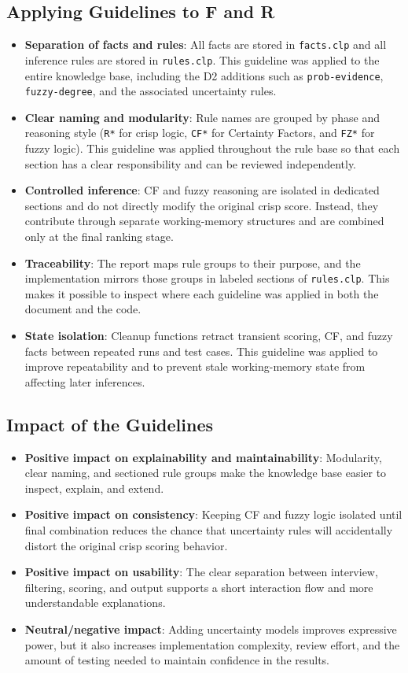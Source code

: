 \documentclass[11pt]{article}
\begin{document}
\subsection{Applying Guidelines to F and R}
\begin{itemize}
  \item \textbf{Separation of facts and rules}: All facts are stored in \texttt{facts.clp} and all inference rules are stored in \texttt{rules.clp}. This guideline was applied to the entire knowledge base, including the D2 additions such as \texttt{prob-evidence}, \texttt{fuzzy-degree}, and the associated uncertainty rules.
  \item \textbf{Clear naming and modularity}: Rule names are grouped by phase and reasoning style (\texttt{R*} for crisp logic, \texttt{CF*} for Certainty Factors, and \texttt{FZ*} for fuzzy logic). This guideline was applied throughout the rule base so that each section has a clear responsibility and can be reviewed independently.
  \item \textbf{Controlled inference}: CF and fuzzy reasoning are isolated in dedicated sections and do not directly modify the original crisp score. Instead, they contribute through separate working-memory structures and are combined only at the final ranking stage.
  \item \textbf{Traceability}: The report maps rule groups to their purpose, and the implementation mirrors those groups in labeled sections of \texttt{rules.clp}. This makes it possible to inspect where each guideline was applied in both the document and the code.
  \item \textbf{State isolation}: Cleanup functions retract transient scoring, CF, and fuzzy facts between repeated runs and test cases. This guideline was applied to improve repeatability and to prevent stale working-memory state from affecting later inferences.
\end{itemize}

\subsection{Impact of the Guidelines}
\begin{itemize}
  \item \textbf{Positive impact on explainability and maintainability}: Modularity, clear naming, and sectioned rule groups make the knowledge base easier to inspect, explain, and extend.
  \item \textbf{Positive impact on consistency}: Keeping CF and fuzzy logic isolated until final combination reduces the chance that uncertainty rules will accidentally distort the original crisp scoring behavior.
  \item \textbf{Positive impact on usability}: The clear separation between interview, filtering, scoring, and output supports a short interaction flow and more understandable explanations.
  \item \textbf{Neutral/negative impact}: Adding uncertainty models improves expressive power, but it also increases implementation complexity, review effort, and the amount of testing needed to maintain confidence in the results.
\end{itemize}
\end{document}
